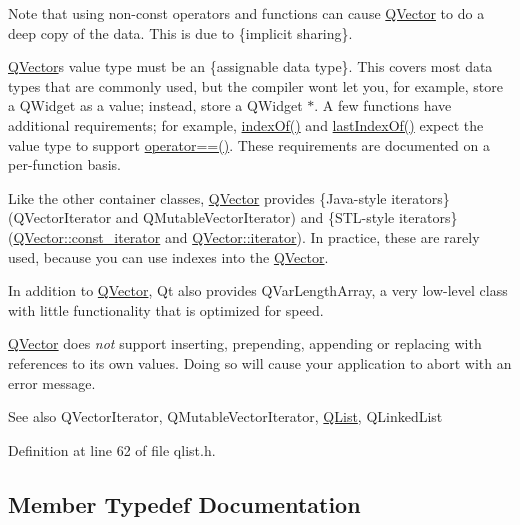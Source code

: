 Note that using non-\/const operators and functions can cause \hyperlink{class_q_vector}{Q\+Vector} to do a deep copy of the data. This is due to \{implicit sharing\}.

\hyperlink{class_q_vector}{Q\+Vector}\textquotesingle{}s value type must be an \{assignable data type\}. This covers most data types that are commonly used, but the compiler won\textquotesingle{}t let you, for example, store a Q\+Widget as a value; instead, store a Q\+Widget $\ast$. A few functions have additional requirements; for example, \hyperlink{class_q_vector_a015c576d25fc9707466b3b301e10f33d}{index\+Of()} and \hyperlink{class_q_vector_a06149e241b9907f6c2b379c4e5279338}{last\+Index\+Of()} expect the value type to support {\ttfamily \hyperlink{class_q_vector_a4d4ee275a13de28d0da7e49085ba7a7d}{operator==()}}. These requirements are documented on a per-\/function basis.

Like the other container classes, \hyperlink{class_q_vector}{Q\+Vector} provides \{Java-\/style iterators\} (Q\+Vector\+Iterator and Q\+Mutable\+Vector\+Iterator) and \{S\+T\+L-\/style iterators\} (\hyperlink{class_q_vector_a01e19bfad7fefd3e97ef197f4ed2cceb}{Q\+Vector\+::const\+\_\+iterator} and \hyperlink{class_q_vector_af6ac26e0dfede6e3045be0c947201267}{Q\+Vector\+::iterator}). In practice, these are rarely used, because you can use indexes into the \hyperlink{class_q_vector}{Q\+Vector}.

In addition to \hyperlink{class_q_vector}{Q\+Vector}, Qt also provides Q\+Var\+Length\+Array, a very low-\/level class with little functionality that is optimized for speed.

\hyperlink{class_q_vector}{Q\+Vector} does {\itshape not} support inserting, prepending, appending or replacing with references to its own values. Doing so will cause your application to abort with an error message.

\begin{DoxySeeAlso}{See also}
Q\+Vector\+Iterator, Q\+Mutable\+Vector\+Iterator, \hyperlink{class_q_list}{Q\+List}, Q\+Linked\+List 
\end{DoxySeeAlso}


Definition at line 62 of file qlist.\+h.



\subsection{Member Typedef Documentation}
